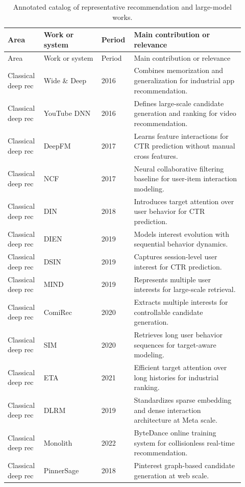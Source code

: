 \documentclass[11pt]{article}
\begin{document}
\scriptsize
\begin{longtable}{@{}p{0.13\linewidth}p{0.23\linewidth}p{0.12\linewidth}p{0.44\linewidth}@{}}
\caption{Annotated catalog of representative recommendation and large-model works.}
\label{tab:catalog-en}\\
\toprule
Area & Work or system & Period & Main contribution or relevance\\
\midrule
\endfirsthead
\toprule
Area & Work or system & Period & Main contribution or relevance\\
\midrule
\endhead
Classical deep rec & Wide \& Deep & 2016 & Combines memorization and generalization for industrial app recommendation.\\
Classical deep rec & YouTube DNN & 2016 & Defines large-scale candidate generation and ranking for video recommendation.\\
Classical deep rec & DeepFM & 2017 & Learns feature interactions for CTR prediction without manual cross features.\\
Classical deep rec & NCF & 2017 & Neural collaborative filtering baseline for user-item interaction modeling.\\
Classical deep rec & DIN & 2018 & Introduces target attention over user behavior for CTR prediction.\\
Classical deep rec & DIEN & 2019 & Models interest evolution with sequential behavior dynamics.\\
Classical deep rec & DSIN & 2019 & Captures session-level user interest for CTR prediction.\\
Classical deep rec & MIND & 2019 & Represents multiple user interests for large-scale retrieval.\\
Classical deep rec & ComiRec & 2020 & Extracts multiple interests for controllable candidate generation.\\
Classical deep rec & SIM & 2020 & Retrieves long user behavior sequences for target-aware modeling.\\
Classical deep rec & ETA & 2021 & Efficient target attention over long histories for industrial ranking.\\
Classical deep rec & DLRM & 2019 & Standardizes sparse embedding and dense interaction architecture at Meta scale.\\
Classical deep rec & Monolith & 2022 & ByteDance online training system for collisionless real-time recommendation.\\
Classical deep rec & PinnerSage & 2018 & Pinterest graph-based candidate generation at web scale.\\

\end{longtable}
\end{document}
